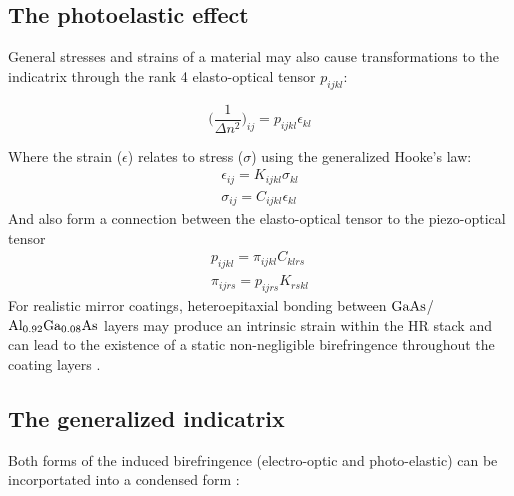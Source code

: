 \subsection{The photoelastic effect}

General stresses and strains of a material may also cause transformations to the indicatrix through the rank 4 elasto-optical tensor $p_{i j k l}$:

\begin{equation}
 \bigg( \frac{1}{\Delta n^2} \bigg)_{ij} = p_{ijkl} \epsilon_{kl}
\end{equation}

\noindent Where the strain ({\boldmath$\epsilon$}) relates to stress ({\boldmath$\sigma$}) using the generalized Hooke's law: 
\begin{equation}\label{eq:genhookeslaw} 
 \begin{split}
	 \epsilon_{ij} = K_{ijkl} \sigma_{kl}
	 \\
	 \sigma_{ij} = C_{ijkl} \epsilon_{kl}
 \end{split}
\end{equation}
And also form a connection between the elasto-optical tensor to the piezo-optical tensor
\begin{equation}\label{eq:indicgenelastooptical}
 \begin{split}
	p_{ijkl} = \pi_{ijkl} C_{klrs}
	\\
	\pi_{ijrs} = p_{ijrs} K_{rskl}
 \end{split}
\end{equation}
For realistic mirror coatings, heteroepitaxial bonding between $\mathrm{GaAs}$/$\mathrm{Al_{0.92}Ga_{0.08}As}$ layers may produce an intrinsic strain within the HR stack and can lead to the existence of a static non-negligible birefringence throughout the coating layers \cite{cole:2016}.

\subsection{The generalized indicatrix}
Both forms of the induced birefringence (electro-optic and photo-elastic) can be incorportated into a condensed form \cite{nye}:

